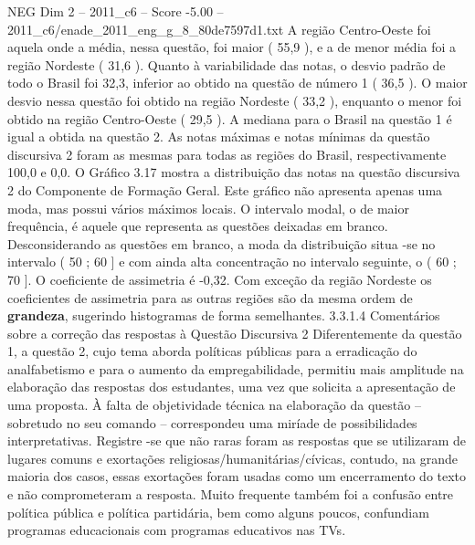 \begin{textsample}{NEG Dim 2 – 2011\_c6 – Score -5.00 – 2011\_c6/enade\_2011\_eng\_g\_8\_80de7597d1.txt}
A região Centro-Oeste foi aquela onde a média, nessa questão, foi maior ( 55,9 ), e a de menor média foi a região Nordeste ( 31,6 ).
Quanto à variabilidade das notas, o desvio padrão de todo o Brasil foi 32,3, inferior ao obtido na questão de número 1 ( 36,5 ).
O maior desvio nessa questão foi obtido na região Nordeste ( 33,2 ), enquanto o menor foi obtido na região Centro-Oeste ( 29,5 ).
A mediana para o Brasil na questão 1 é igual a obtida na questão 2.
As notas máximas e notas mínimas da questão discursiva 2 foram as mesmas para todas as regiões do Brasil, respectivamente 100,0 e 0,0.
O Gráfico 3.17 mostra a distribuição das notas na questão discursiva 2 do Componente de Formação Geral.
Este gráfico não apresenta apenas uma moda, mas possui vários máximos locais.
O intervalo modal, o de maior frequência, é aquele que representa as questões deixadas em branco.
Desconsiderando as questões em branco, a moda da distribuição situa -se no intervalo ( 50 ; 60 ] e com ainda alta concentração no intervalo seguinte, o ( 60 ; 70 ].
O coeficiente de assimetria é -0,32.
Com exceção da região Nordeste os coeficientes de assimetria para as outras regiões são da mesma ordem de \textbf{grandeza}, sugerindo histogramas de forma semelhantes. 3.3.1.4 Comentários sobre a correção das respostas à Questão Discursiva 2 Diferentemente da questão 1, a questão 2, cujo tema aborda políticas públicas para a erradicação do analfabetismo e para o aumento da empregabilidade, permitiu mais amplitude na elaboração das respostas dos estudantes, uma vez que solicita a apresentação de uma proposta.
À falta de objetividade técnica na elaboração da questão – sobretudo no seu comando – correspondeu uma miríade de possibilidades interpretativas.
Registre -se que não raras foram as respostas que se utilizaram de lugares comuns e exortações religiosas/humanitárias/cívicas, contudo, na grande maioria dos casos, essas exortações foram usadas como um encerramento do texto e não comprometeram a resposta.
Muito frequente também foi a confusão entre política pública e política partidária, bem como alguns poucos, confundiam programas educacionais com programas educativos nas TVs.

\end{textsample}
